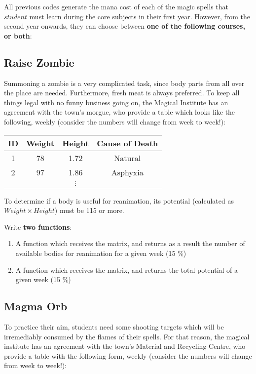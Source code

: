 \documentclass[11pt, onside]{article}
\begin{document}
All previous codes generate the mana cost of each of the magic spells that $student$ must learn during the core subjects in their first year.
However, from the second year onwards, they can choose between \textbf{one of the following courses, or both}:

\subsection{Raise Zombie}

Summoning a zombie is a very complicated task, since body parts from all over the place are needed.
Furthermore, fresh meat is always preferred.
To keep all things legal with no funny business going on, the Magical Institute has an agreement with the town's morgue,
who provide a table which looks like the following, weekly (consider the numbers will change from week to week!):

\begin{table}[htbp]
    \centering
    \begin{tabular}{@{}cccc@{}}
    \toprule
    \textbf{ID} & \textbf{Weight} & \textbf{Height} & \textbf{Cause of Death} \\ \midrule
    1 & 78 & 1.72 & Natural \\
    2 & 97 & 1.86 & Asphyxia \\
     &  & $\vdots$ &  \\ \bottomrule
    \end{tabular}
\end{table}

To determine if a body is useful for reanimation, its potential (calculated as $Weight \times Height$) must be 115 or more.

\bigskip

Write \textbf{two functions}:

\begin{enumerate}
    \item A function which receives the matrix, and returns as a result the number of available bodies for reanimation for a given week (15 \%)
    \item A function which receives the matrix, and returns the total potential of a given week (15 \%)
\end{enumerate}

\subsection{Magma Orb}

To practice their aim, students need some shooting targets which will be irremediably consumed by the flames of their spells.
For that reason, the magical institute has an agreement with the town's Material and Recycling Centre, who provide a table with the following form, weekly (consider the numbers will change from week to week!):
\end{document}
